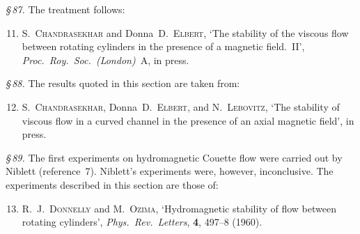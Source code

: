 \noindent\textit{\S\,87.} The treatment follows:

\begin{enumerate}
\setcounter{enumi}{10}
\item S.~\textsc{Chandrasekhar} and Donna~D.~\textsc{Elbert}, `The stability of the viscous flow between rotating cylinders in the presence of a magnetic field.~II', \textit{Proc.\ Roy.\ Soc.\ (London)}~A, in press.
\end{enumerate}

\noindent\textit{\S\,88.} The results quoted in this section are taken from:

\begin{enumerate}
\setcounter{enumi}{11}
\item S.~\textsc{Chandrasekhar}, Donna~D.~\textsc{Elbert}, and N.~\textsc{Lebovitz}, `The stability of viscous flow in a curved channel in the presence of an axial magnetic field', in press.
\end{enumerate}

\noindent\textit{\S\,89.} The first experiments on hydromagnetic Couette flow were carried out by Niblett (reference~7). Niblett's experiments were, however, inconclusive. The experiments described in this section are those of:

\begin{enumerate}
\setcounter{enumi}{12}
\item R.~J.~\textsc{Donnelly} and M.~\textsc{Ozima}, `Hydromagnetic stability of flow between rotating cylinders', \textit{Phys.\ Rev.\ Letters}, \textbf{4}, 497--8 (1960).
\end{enumerate}
